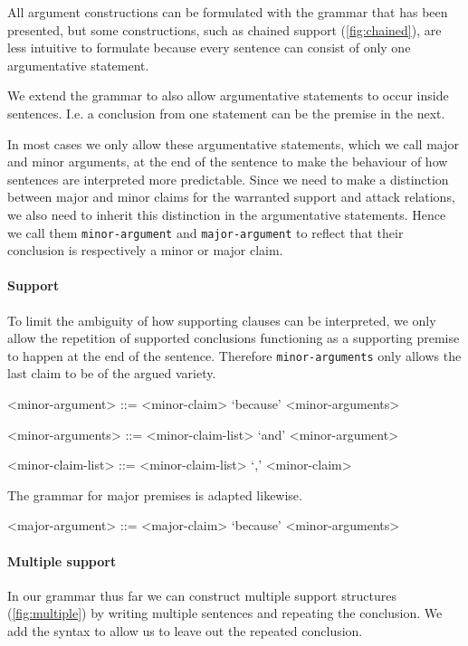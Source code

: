 \noindent All argument constructions can be formulated with the grammar that has been presented, but some constructions, such as chained support (\autoref{fig:chained}), are less intuitive to formulate because every sentence can consist of only one argumentative statement.

We extend the grammar to also allow argumentative statements to occur inside sentences. I.e. a conclusion from one statement can be the premise in the next.

In most cases we only allow these argumentative statements, which we call major and minor arguments, at the end of the sentence to make the behaviour of how sentences are interpreted more predictable. Since we need to make a distinction between major and minor claims for the warranted support and attack relations, we also need to inherit this distinction in the argumentative statements. Hence we call them \texttt{minor-argument} and \texttt{major-argument} to reflect that their conclusion is respectively a minor or major claim.

\paragraph{Support}
To limit the ambiguity of how supporting clauses can be interpreted, we only allow the repetition of supported conclusions functioning as a supporting premise to happen at the end of the sentence. Therefore \texttt{minor-arguments} only allows the last claim to be of the argued variety.

\begin{grammar}
<minor-argument> ::= <minor-claim> `because' <minor-arguments> %

<minor-arguments> ::= <minor-claim-list> `and' <minor-argument>

<minor-claim-list> ::= <minor-claim-list> `,' <minor-claim>
\end{grammar}

\noindent The grammar for major premises is adapted likewise.

\begin{grammar}
<major-argument> ::= <major-claim> `because' <minor-arguments> %
\end{grammar}

\paragraph{Multiple support}
In our grammar thus far we can construct multiple support structures (\autoref{fig:multiple}) by writing multiple sentences and repeating the conclusion. We add the syntax to allow us to leave out the repeated conclusion.

